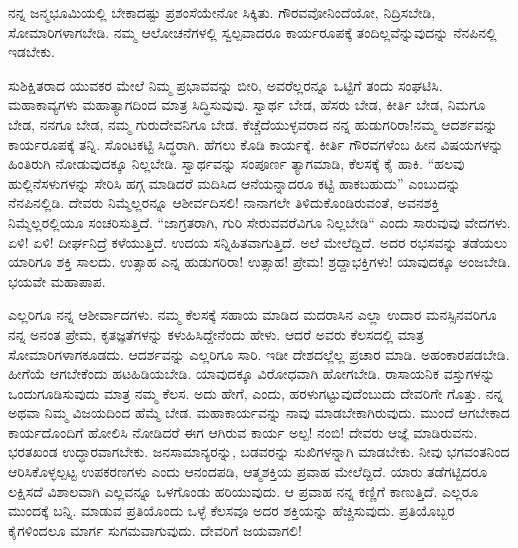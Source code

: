 ನನ್ನ ಜನ್ಮಭೂಮಿಯಲ್ಲಿ ಬೇಕಾದಷ್ಟು ಪ್ರಶಂಸೆಯೇನೋ ಸಿಕ್ಕಿತು. ಗೌರವವೋ\break ನಿಂದೆಯೋ, ನಿದ್ರಿಸಬೇಡಿ, ಸೋಮಾರಿಗಳಾಗಬೇಡಿ. ನಮ್ಮ ಆಲೋಚನೆಗಳಲ್ಲಿ ಸ್ವಲ್ಪವಾದರೂ ಕಾರ್ಯರೂಪಕ್ಕೆ ತಂದಿಲ್ಲವೆನ್ನುವುದನ್ನು ನೆನಪಿನಲ್ಲಿ ಇಡಬೇಕು.

ಸುಶಿಕ್ಷಿತರಾದ ಯುವಕರ ಮೇಲೆ ನಿಮ್ಮ ಪ್ರಭಾವವನ್ನು ಬೀರಿ, ಅವರೆಲ್ಲರನ್ನೂ ಒಟ್ಟಿಗೆ ತಂದು ಸಂಘಟಿಸಿ. ಮಹಾಕಾವ್ಯಗಳು ಮಹಾತ್ಯಾಗದಿಂದ ಮಾತ್ರ ಸಿದ್ಧಿಸುವುವು. ಸ್ವಾರ್ಥ ಬೇಡ, ಹೆಸರು ಬೇಡ, ಕೀರ್ತಿ ಬೇಡ, ನಿಮಗೂ ಬೇಡ, ನನಗೂ ಬೇಡ, ನಮ್ಮ ಗುರುದೇವನಿಗೂ ಬೇಡ. ಕೆಚ್ಚೆದೆಯುಳ್ಳವರಾದ ನನ್ನ ಹುಡುಗರಿರಾ!ನಮ್ಮ ಆದರ್ಶವನ್ನು ಕಾರ್ಯರೂಪಕ್ಕೆ ತನ್ನಿ. ಸೊಂಟಕಟ್ಟಿ ಸಿದ್ಧರಾಗಿ. ಹೆಗಲು ಕೊಡಿ ಕಾರ್ಯಕ್ಕೆ. ಕೀರ್ತಿ ಗೌರವಗಳೆಂಬ ಹೀನ ವಿಷಯಗಳನ್ನು ಹಿಂತಿರುಗಿ ನೋಡುವುದಕ್ಕೂ ನಿಲ್ಲಬೇಡಿ. ಸ್ವಾರ್ಥವನ್ನು ಸಂಪೂರ್ಣ ತ್ಯಾಗಮಾಡಿ, ಕೆಲಸಕ್ಕೆ ಕೈ ಹಾಕಿ. “ಹಲವು ಹುಲ್ಲಿನೆಸಳುಗಳನ್ನು ಸೇರಿಸಿ ಹಗ್ಗ ಮಾಡಿದರೆ ಮದಿಸಿದ ಆನೆಯನ್ನಾದರೂ ಕಟ್ಟಿ ಹಾಕಬಹುದು” ಎಂಬುದನ್ನು ನೆನಪಿನಲ್ಲಿಡಿ. ದೇವರು ನಿಮ್ಮೆಲ್ಲರನ್ನೂ ಆಶೀರ್ವದಿಸಲಿ! ನಾನಾಗಲೇ ತಿಳಿದುಕೊಂಡಿರುವಂತೆ, ಅವನಶಕ್ತಿ ನಿಮ್ಮೆಲ್ಲರಲ್ಲಿಯೂ ಸಂಚರಿಸುತ್ತಿದೆ. “ಜಾಗ್ರತರಾಗಿ, ಗುರಿ ಸೇರುವವರೆವಿಗೂ ನಿಲ್ಲಬೇಡಿ“ ಎಂದು ಸಾರುವುವು ವೇದಗಳು. ಏಳಿ! ಏಳಿ! ದೀರ್ಘನಿದ್ರೆ ಕಳೆಯುತ್ತಿದೆ. ಉದಯ ಸನ್ನಿಹಿತವಾಗುತ್ತಿದೆ. ಅಲೆ ಮೇಲೆದ್ದಿದೆ. ಅದರ ರಭಸವನ್ನು ತಡೆಯಲು ಯಾರಿಗೂ ಶಕ್ತಿ ಸಾಲದು. ಉತ್ಸಾಹ ಎನ್ನ ಹುಡುಗರಿರಾ! ಉತ್ಸಾಹ! ಪ್ರೇಮ! ಶ್ರದ್ದಾಭಕ್ತಿಗಳು! ಯಾವುದಕ್ಕೂ ಅಂಜಬೇಡಿ. ಭಯವೇ ಮಹಾಪಾಪ.

ಎಲ್ಲರಿಗೂ ನನ್ನ ಆಶೀರ್ವಾದಗಳು. ನಮ್ಮ ಕೆಲಸಕ್ಕೆ ಸಹಾಯ ಮಾಡಿದ ಮದರಾಸಿನ ಎಲ್ಲಾ ಉದಾರ ಮನಸ್ಸಿನವರಿಗೂ ನನ್ನ ಅನಂತ ಪ್ರೇಮ, ಕೃತಜ್ಞತೆಗಳನ್ನು ಕಳುಹಿಸಿದ್ದೇನೆಂದು ಹೇಳು. ಆದರೆ ಅವರು ಕೆಲಸದಲ್ಲಿ ಮಾತ್ರ ಸೋಮಾರಿಗಳಾಗಕೂಡದು. ಆದರ್ಶವನ್ನು ಎಲ್ಲರಿಗೂ ಸಾರಿ. ಇಡೀ ದೇಶದಲ್ಲೆಲ್ಲ ಪ್ರಚಾರ ಮಾಡಿ. ಅಹಂಕಾರಪಡಬೇಡಿ. ಹೀಗೆಯೆ ಆಗಬೇಕೆಂದು ಹಟಹಿಡಿಯಬೇಡಿ. ಯಾವುದಕ್ಕೂ ವಿರೋಧವಾಗಿ ಹೋಗಬೇಡಿ. ರಾಸಾಯನಿಕ ವಸ್ತುಗಳನ್ನು ಒಂದುಗೂಡಿಸುವುದು ಮಾತ್ರ ನಮ್ಮ ಕೆಲಸ. ಅದು ಹೇಗೆ, ಎಂದು, ಹರಳುಗಟ್ಟುವುದೆಂಬುದು ದೇವರಿಗೇ ಗೊತ್ತು. ನನ್ನ ಅಥವಾ ನಿಮ್ಮ ವಿಜಯದಿಂದ ಹೆಮ್ಮೆ ಬೇಡ. ಮಹಾಕಾರ್ಯವನ್ನು ನಾವು ಮಾಡಬೇಕಾಗಿರುವುದು. ಮುಂದೆ ಆಗಬೇಕಾದ ಕಾರ್ಯದೊಂದಿಗೆ ಹೋಲಿಸಿ ನೋಡಿದರೆ ಈಗ ಆಗಿರುವ ಕಾರ್ಯ ಅಲ್ಪ! ನಂಬಿ! ದೇವರು ಆಜ್ಞೆ ಮಾಡಿರುವನು. ಭರತಖಂಡ ಉದ್ಧಾರವಾಗಬೇಕು. ಜನಸಾಮಾನ್ಯರನ್ನು, ಬಡವರನ್ನು ಸುಖಿಗಳನ್ನಾಗಿ ಮಾಡಬೇಕು. ನೀವು ಭಗವಂತನಿಂದ ಆರಿಸಿಕೊಳ್ಳಲ್ಪಟ್ಟ ಉಪಕರಣಗಳು ಎಂದು ಆನಂದಪಡಿ, ಆತ್ಮಶಕ್ತಿಯ ಪ್ರವಾಹ ಮೇಲೆದ್ದಿದೆ. ಯಾರು ತಡೆಗಟ್ಟಿದರೂ ಲಕ್ಷಿಸದೆ ವಿಶಾಲವಾಗಿ ಎಲ್ಲವನ್ನೂ ಒಳಗೊಂಡು ಹರಿಯುವುದು. ಆ ಪ್ರವಾಹ ನನ್ನ ಕಣ್ಣಿಗೆ ಕಾಣುತ್ತಿದೆ. ಎಲ್ಲರೂ ಮುಂದಕ್ಕೆ ಬನ್ನಿ. ಮಾಡುವ ಪ್ರತಿಯೊಂದು ಒಳ್ಳೆ ಕೆಲಸವೂ ಅದರ ಶಕ್ತಿಯನ್ನು ಹೆಚ್ಚಿಸುವುದು. ಪ್ರತಿಯೊಬ್ಬರ ಕೈಗಳಿಂದಲೂ ಮಾರ್ಗ ಸುಗಮವಾಗುವುದು. ದೇವರಿಗೆ ಜಯವಾಗಲಿ!

